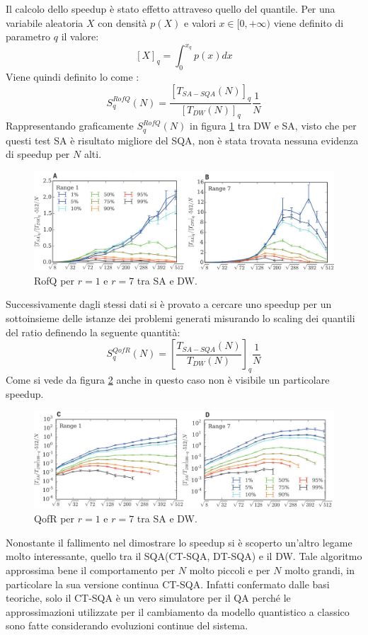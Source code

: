 Il calcolo dello speedup è stato effetto attraveso quello del quantile. Per una variabile aleatoria $X$ con densità $p(X)$ e valori $x \in [0, +\infty)$ viene definito  di parametro $q$ il valore:
$$[X]_q = \int_0^{x_q} p(x) dx$$
Viene quindi definito lo  come :
$$S_{q}^{RofQ}(N) = \frac{[T_{SA-SQA}(N)]_q}{[T_{DW}(N)]_q}\frac{1}{N}$$
Rappresentando graficamente $S_{q}^{RofQ}(N)$ in figura \ref{figura:RofQ} tra DW e SA, visto che per questi test SA è risultato migliore del SQA, non è stata trovata nessuna evidenza di speedup per $N$ alti.

\begin{figure}[htbp]
  \centering
  \includegraphics[scale=0.3]{Immagini/RofQ.jpg}
  \caption{RofQ per $r=1$ e $r=7$ tra SA e DW.}
  \label{figura:RofQ}
\end{figure}

Successivamente dagli stessi dati si è provato a cercare uno speedup per un sottoinsieme delle istanze dei problemi generati misurando lo scaling dei quantili del ratio definendo la seguente quantità:
$$S_{q}^{QofR}(N) = \left[\frac{T_{SA-SQA}(N)}{T_{DW}(N)}\right]_q \frac{1}{N}$$
Come si vede da figura \ref{figura:QofR} anche in questo caso non è visibile un particolare speedup.
\begin{figure}[htbp]
  \centering
  \includegraphics[scale=0.3]{Immagini/QofR.jpg}
  \caption{QofR per $r=1$ e $r=7$ tra SA e DW.}
  \label{figura:QofR}
\end{figure}


Nonostante il fallimento nel dimostrare lo speedup si è scoperto un'altro legame molto interessante, quello tra il SQA(CT-SQA, DT-SQA) e il DW. Tale algoritmo approssima bene il comportamento per $N$ molto piccoli e per $N$ molto grandi\cite{EQA}, in particolare la sua versione continua CT-SQA\cite{QVC}. Infatti confermato dalle basi teoriche, solo il CT-SQA è un vero simulatore per il QA perché le approssimazioni utilizzate per il cambiamento da modello quantistico a classico sono fatte considerando evoluzioni continue del sistema.

